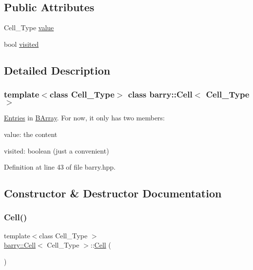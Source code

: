 \subsection*{Public Attributes}
\begin{DoxyCompactItemize}
\item 
Cell\+\_\+\+Type \hyperlink{classbarry_1_1_cell_a52918ded332c6a12109b5962d6bf3ae9}{value}
\item 
bool \hyperlink{classbarry_1_1_cell_ad7800879e5079e6b5a3982827adc38c1}{visited}
\end{DoxyCompactItemize}


\subsection{Detailed Description}
\subsubsection*{template$<$class Cell\+\_\+\+Type$>$\newline
class barry\+::\+Cell$<$ Cell\+\_\+\+Type $>$}

\hyperlink{classbarry_1_1_entries}{Entries} in \hyperlink{classbarry_1_1_b_array}{B\+Array}. For now, it only has two members\+: 


\begin{DoxyItemize}
\item value\+: the content
\item visited\+: boolean (just a convenient) 
\end{DoxyItemize}

Definition at line 43 of file barry.\+hpp.



\subsection{Constructor \& Destructor Documentation}
\mbox{\label{classbarry_1_1_cell_aa7beee933fc291cbc4ac84ec3ab63352}} 
\subsubsection{\texorpdfstring{Cell()}{Cell()}\hspace{0.1cm}{\footnotesize\ttfamily [1/6]}}
{\footnotesize\ttfamily template$<$class Cell\+\_\+\+Type $>$ \\
\hyperlink{classbarry_1_1_cell}{barry\+::\+Cell}$<$ Cell\+\_\+\+Type $>$\+::\hyperlink{classbarry_1_1_cell}{Cell} (\begin{DoxyParamCaption}{ }\end{DoxyParamCaption})}

